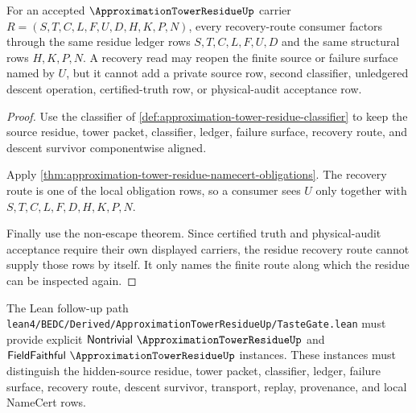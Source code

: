 \begin{theorem}
\label{thm:approximation-tower-residue-recovery-route-determinacy}
For an accepted $\ApproximationTowerResidueUp$ carrier $R=(S,T,C,L,F,U,D,H,K,P,N)$, every recovery-route consumer factors through the same residue ledger rows $S,T,C,L,F,U,D$ and the same structural rows $H,K,P,N$. A recovery read may reopen the finite source or failure surface named by $U$, but it cannot add a private source row, second classifier, unledgered descent operation, certified-truth row, or physical-audit acceptance row.
\end{theorem}
\begin{proof}
Use the classifier of \autoref{def:approximation-tower-residue-classifier} to keep the source residue, tower packet, classifier, ledger, failure surface, recovery route, and descent survivor componentwise aligned.

Apply \autoref{thm:approximation-tower-residue-namecert-obligations}. The recovery route is one of the local obligation rows, so a consumer sees $U$ only together with $S,T,C,L,F,D,H,K,P,N$.

Finally use the non-escape theorem. Since certified truth and physical-audit acceptance require their own displayed carriers, the residue recovery route cannot supply those rows by itself. It only names the finite route along which the residue can be inspected again.
\end{proof}

The Lean follow-up path \texttt{lean4/BEDC/Derived/ApproximationTowerResidueUp/TasteGate.lean} must provide explicit $\mathsf{Nontrivial}\ \ApproximationTowerResidueUp$ and $\mathsf{FieldFaithful}\ \ApproximationTowerResidueUp$ instances. These instances must distinguish the hidden-source residue, tower packet, classifier, ledger, failure surface, recovery route, descent survivor, transport, replay, provenance, and local NameCert rows.



